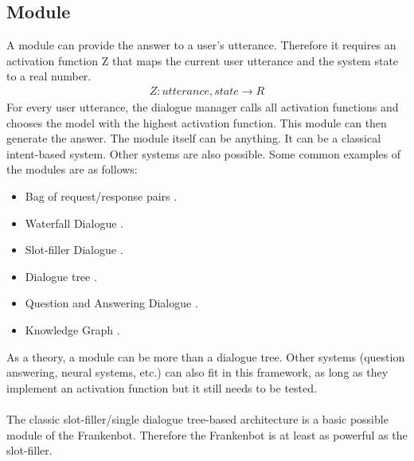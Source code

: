 \subsection{Module}
A module can provide the answer to a user's utterance. Therefore it requires an activation function Z that maps the current user utterance and the system state to a real number.
\begin{align*}
 Z: utterance, state \rightarrow R
\end{align*} 
For every user utterance, the dialogue manager calls all activation functions and chooses the model with the highest activation function. This module can then generate the answer. The module itself can be anything. It can be a classical intent-based system. Other systems are also possible. Some common examples of the modules are as follows:
\begin{itemize}
\item Bag of request/response pairs \cite{rrpairs}.
\item Waterfall Dialogue \cite{waterfallDial}.       
\item Slot-filler Dialogue \cite{slotfillerDial}.
\item Dialogue tree \cite{dialogTree}.
\item Question and Answering Dialogue \cite{q&aDialog}.
\item Knowledge Graph \cite{knowlGraph}.
\end{itemize}
\noindent
As a theory, a module can be more than a dialogue tree. Other systems (question answering, neural systems, etc.) can also fit in this framework, as long as they implement an activation function but it still needs to be tested. 
\\~\\
The classic slot-filler/single dialogue tree-based architecture is a basic possible module of the Frankenbot. Therefore the Frankenbot is at least as powerful as the slot-filler.

